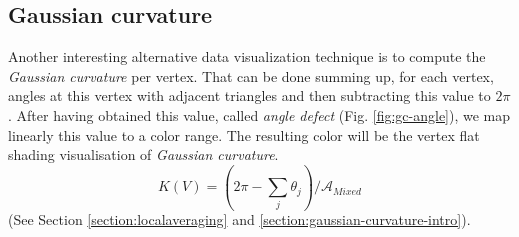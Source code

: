\subsection{Gaussian curvature}
\label{section:vertex-area-gaussian-curvature}
Another interesting alternative data visualization technique is to compute the \textit{Gaussian curvature} per vertex. That can be done summing up, for each vertex, angles at this vertex with adjacent triangles and then subtracting this value to $2\pi$.
After having obtained this value, called \textit{angle defect} (Fig. \ref{fig:gc-angle}), we map linearly this value to a color range.
The resulting color will be the vertex flat shading visualisation of \textit{Gaussian curvature}.
$$K(V) = (2\pi - \sum_j \theta_j)/\mathcal{A}_{Mixed}$$
(See Section \ref{section:localaveraging} and \ref{section:gaussian-curvature-intro}).

